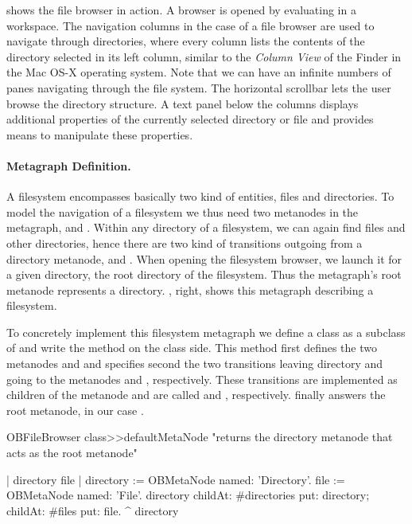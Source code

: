 \documentclass[a4paper,10pt,twoside]{book}
\begin{document}
 shows the file browser in action. A browser is opened by evaluating  in a workspace. The navigation columns in the case of a file browser are used to navigate through directories, where every column lists the contents of the directory selected in its left column, similar to the \emph{Column View} of the Finder in the Mac OS-X operating system.
Note that we can have an infinite numbers of panes navigating through the file system. The horizontal scrollbar lets the user browse the directory structure. A text panel below the columns displays additional properties of the currently selected directory or file and provides means to manipulate these properties.

\paragraph{Metagraph Definition.} 
A filesystem encompasses basically two kind of entities, files and directories. To model the navigation of a filesystem we thus need two metanodes in the metagraph,  and . Within any directory of a filesystem, we can again find files and other directories, hence there are two kind of transitions outgoing from a directory metanode,  and . When opening the filesystem browser, we launch it for a given directory, \eg the root directory of the filesystem. Thus the metagraph's root metanode represents a directory. , right, shows this metagraph describing a filesystem.

To concretely implement this filesystem metagraph we define a class  as a subclass of  and write the method  on the class side. This method first defines the two metanodes   and  and specifies second the two transitions leaving directory and going to the metanodes  and , respectively. These transitions are implemented as children of the metanode  and are called  and , respectively.  finally answers the root metanode, in our case .

\begin{code}{}
OBFileBrowser class>>defaultMetaNode
     "returns the directory metanode that acts as the root metanode"
 
     | directory file |
     directory := OBMetaNode named: 'Directory'.
     file := OBMetaNode named: 'File'.
     directory 
          childAt: #directories put: directory;
          childAt: #files put: file.
     ^ directory
\end{code}
\end{document}
